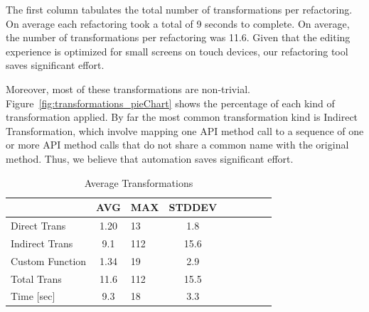 \documentclass{sigplanconf}
\begin{document}
The first column tabulates the total number of transformations per refactoring. On average each refactoring took a total of 9 seconds to complete.  On average, the number of transformations per refactoring was 11.6. Given that the \TD editing experience is optimized for small screens on touch devices, our refactoring tool saves significant effort.


Moreover, most of these transformations are non-trivial. Figure~\ref{fig:transformations_pieChart} shows the percentage of each kind of transformation applied. By far the most common transformation kind is Indirect Transformation, which involve mapping one API method call to a sequence of one or more API method calls that do not share a common name with the original method. Thus, we believe that automation saves significant effort.

\begin{table}[htdp]
\begin{center}
\begin{tabular}{lclclclcl}

& AVG & MAX & STDDEV \\
\hline
\hline
Direct Trans & 1.20 & 13 & 1.8 \\
\hline
Indirect Trans & 9.1  & 112 & 15.6\\
\hline
Custom Function & 1.34 & 19 & 2.9 \\
\hline
Total Trans & 11.6 & 112 & 15.5 \\
\hline 
Time [sec] & 9.3 & 18 & 3.3\\


\end{tabular}
\nocaptionrule
\caption{Average Transformations}
\label{table:avgTrans}
\end{center}
\end{table}%
\end{document}
